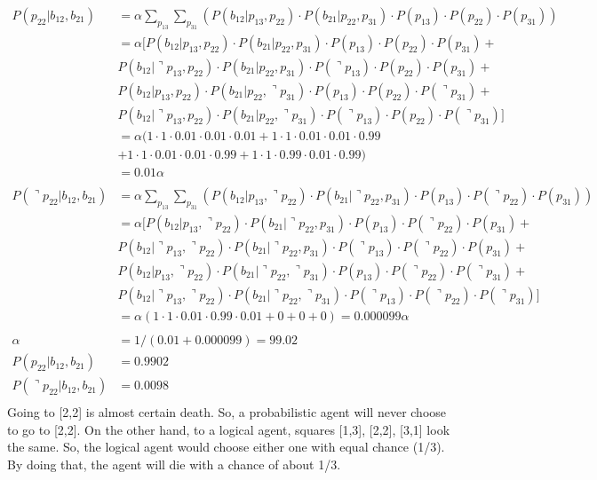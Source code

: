 \documentclass[letterpaper, 12pt]{artikel3}
\begin{document}
\begin{align*}
P(p_{22}| b_{12},b_{21}) &=\alpha \sum_{p_{13}} \sum_{p_{31}}(P(b_{12}|p_{13},p_{22}) \cdot P(b_{21}|p_{22},p_{31})\cdot P(p_{13}) \cdot P(p_{22}) \cdot P(p_{31}) )  \\ 
&=  \alpha[ P(b_{12}|p_{13},p_{22}) \cdot P(b_{21}|p_{22},p_{31})\cdot  P(p_{13}) \cdot P(p_{22}) \cdot P(p_{31})  +  \\
\quad & P(b_{12}|\urcorner p_{13},p_{22}) \cdot P(b_{21}| p_{22},p_{31})\cdot  P(\urcorner p_{13}) \cdot P( p_{22}) \cdot P(p_{31})  + \\
\quad& P(b_{12}|p_{13},p_{22}) \cdot P(b_{21}|p_{22},\urcorner p_{31})\cdot  P(p_{13}) \cdot P(p_{22}) \cdot P(\urcorner p_{31}) +\\
\quad& P(b_{12} |\urcorner p_{13},p_{22}) \cdot P(b_{21}| p_{22},\urcorner p_{31})\cdot  P( \urcorner p_{13}) \cdot P( p_{22}) \cdot P(\urcorner p_{31}) ] \\
& = \alpha( 1 \cdot 1\cdot 0.01 \cdot 0.01 \cdot 0.01 
+ 1 \cdot 1\cdot 0.01 \cdot 0.01 \cdot 0.99 \\
& + 1 \cdot 1\cdot 0.01 \cdot 0.01 \cdot 0.99
+  1 \cdot 1 \cdot 0.99 \cdot 0.01 \cdot 0.99) \\
& = 0.01 \alpha \\
\\
P(\urcorner p_{22}| b_{12},b_{21}) &=\alpha \sum_{p_{13}} \sum_{p_{31}}(P(b_{12}|p_{13},\urcorner  p_{22}) \cdot P(b_{21}| \urcorner p_{22},p_{31})\cdot P(p_{13}) \cdot P(\urcorner  p_{22}) \cdot P(p_{31}) )  \\
&=  \alpha[ P(b_{12}|p_{13},\urcorner p_{22}) \cdot P(b_{21}|\urcorner p_{22},p_{31})\cdot  P(p_{13}) \cdot P(\urcorner p_{22}) \cdot P(p_{31})  +  \\
\quad & P(b_{12}|\urcorner p_{13},\urcorner p_{22}) \cdot P(b_{21}| \urcorner p_{22},p_{31})\cdot  P(\urcorner p_{13}) \cdot P(\urcorner p_{22}) \cdot P(p_{31})  + \\
\quad& P(b_{12}|p_{13},\urcorner p_{22}) \cdot P(b_{21}|\urcorner p_{22},\urcorner p_{31})\cdot  P(p_{13}) \cdot P(\urcorner p_{22}) \cdot P(\urcorner p_{31}) +\\
\quad& P(b_{12} |\urcorner p_{13},\urcorner p_{22}) \cdot P(b_{21}| \urcorner p_{22},\urcorner p_{31})\cdot  P( \urcorner p_{13}) \cdot P(\urcorner  p_{22}) \cdot P(\urcorner p_{31}) ] \\ 
& = \alpha( 1 \cdot 1  \cdot 0.01\cdot 0.99 \cdot 0.01 + 0 + 0+0) = 0.000099 \alpha \\
\\
\alpha & = 1/(0.01 + 0.000099) = 99.02\\
P(p_{22}| b_{12},b_{21}) &= 0.9902\\
P(\urcorner p_{22}| b_{12},b_{21}) &=0.0098 \\
\end{align*}
Going to [2,2] is almost certain death. So, a probabilistic agent will never choose to go to [2,2].
On the other hand, to a logical agent, squares [1,3], [2,2], [3,1] look the same. So, the logical agent would choose either one with equal chance (1/3). By doing that, the agent will die with a chance of about 1/3.
\end{document}
